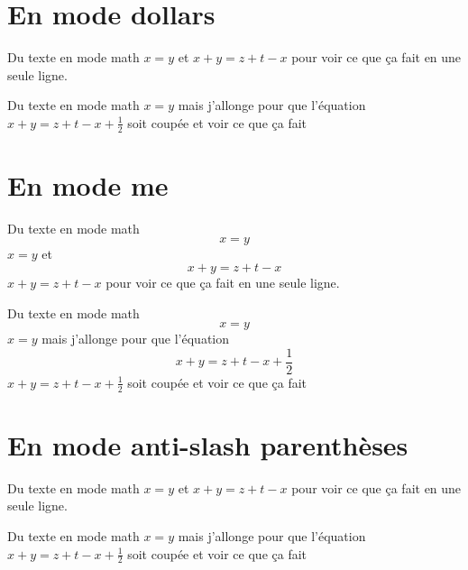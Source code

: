 \documentclass[11pt,a4paper]{article}
\newlength{\longueurequation}
\newlength{\longueurrestante}
\newcommand{\me}[1]{%
		\setlength{\longueurrestante}{\the\linegoal}%
		\settowidth{\longueurequation}{$#1$}%
		\ifthenelse{\longueurequation>\longueurrestante}%
			{\begin{displaymath} #1 \end{displaymath}}%
			{$#1$}%
	}
\begin{document}
\section{En mode dollars}

Du texte en mode math $x=y$ et $x+y=z+t-x$ pour voir ce que ça fait en une seule ligne.

Du texte en mode math $x=y$ mais j'allonge pour que l'équation  $x+y=z+t-x+\frac{1}{2}$ soit coupée et voir ce que ça fait


\section{En mode me}

Du texte en mode math \me{x=y} et \me{x+y=z+t-x} pour voir ce que ça fait en une seule ligne.

Du texte en mode math \me{x=y} mais j'allonge pour que l'équation \me{x+y=z+t-x+\frac{1}{2}} soit coupée et voir ce que ça fait


\section{En mode anti-slash parenthèses}

Du texte en mode math \(x=y\) et \(x+y=z+t-x\) pour voir ce que ça fait en une seule ligne.

Du texte en mode math \(x=y\) mais j'allonge pour que l'équation \(x+y=z+t-x+\frac{1}{2}\) soit coupée et voir ce que ça fait
\end{document}
